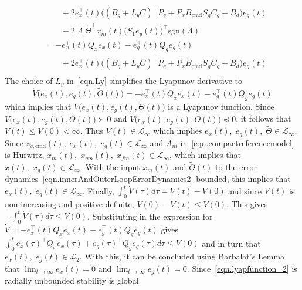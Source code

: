 \begin{proof-dan}
\begin{equation*}
\begin{split}
      & \qquad
      + 2e_{x}^{\top}(t)\bigr((B_{g}+L_{y}C)^{\top}P_{g} + P_{x}B_{\text{cmd}}S_{g}C_{g} + B_{d} \bigr)e_{g}(t) \\
      & \qquad
      - 2|\Lambda|\widetilde{\Theta}^{\top}x_{m}(t)\bigr(S_{1}e_{y}(t)\bigr)^{\top}\text{sgn}(\Lambda) \\
      &=
      - e_{x}^{\top}(t)Q_{x}e_{x}(t)
      - e_{g}^{\top}(t)Q_{g}e_{g}(t) \\
      & \qquad
      + 2e_{x}^{\top}(t)\bigr((B_{g}+L_{y}C)^{\top}P_{g} + P_{x}B_{\text{cmd}}S_{g}C_{g} + B_{d} \bigr)e_{g}(t) \\
    \end{split}
  \end{equation*}
  The choice of $L_{y}$ in\ \eqref{eqn.Ly} simplifies the Lyapunov derivative to
  \begin{equation}
    \label{eqn.outerlooplyapderivative}
    \dot{V}\bigr(e_{x}(t), e_{g}(t), \widetilde{\Theta}(t)\bigr)
    =
    - e_{x}^{\top}(t)Q_{x}e_{x}(t)
    - e_{g}^{\top}(t)Q_{g}e_{g}(t)
  \end{equation}
  which implies that $V\bigr(e_{x}(t), e_{g}(t), \widetilde{\Theta}(t)\bigr)$ is a Lyapunov function.
  Since $V\bigr(e_{x}(t), e_{g}(t), \widetilde{\Theta}(t)\bigr)\succ0$ and $\dot{V}\bigr(e_{x}(t), e_{g}(t), \widetilde{\Theta}(t)\bigr)\preceq0$, it follows that $V(t)\leq V(0)<\infty$.
  Thus $V(t)\in\mathcal{L}_{\infty}$ which implies $e_{x}(t), \; e_{g}(t), \; \widetilde{\Theta}\in\mathcal{L}_{\infty}$.
  Since $z_{g,\text{cmd}}(t), \; e_{x}(t), \; e_{g}(t) \in\mathcal{L}_{\infty}$ and $\bar{A}_{m}$ in\ \eqref{eqn.compactreferencemodel} is Hurwitz, $x_{m}(t), \; x_{gm}(t), \; x_{fm}(t) \in\mathcal{L}_{\infty}$, which implies that $x(t), \; x_{g}(t) \in\mathcal{L}_{\infty}$.
  With the input $x_{m}(t)$ and $\widetilde{\Theta}(t)$ to the error dynamics\ \eqref{eqn.innerAndOuterLoopErrorDynamics2} bounded, this implies that $\dot{e}_{x}(t), \; \dot{e}_{g}(t)\in\mathcal{L}_{\infty}$.
  Finally, $\int_{0}^{t}\dot{V}(\tau)d\tau=V(t)-V(0)$ and since $V(t)$ is non increasing and positive definite, $V(0)-V(t)\leq V(0)$.
  This gives $-\int_{0}^{t}\dot{V}(\tau)d\tau\leq V(0)$.
  Substituting in the expression for $\dot{V}= - e_{x}^{\top}(t)Q_{x}e_{x}(t) - e_{g}^{\top}(t)Q_{g}e_{g}(t)$ gives $\int_{0}^{t}e_{x}(\tau)^{\top}Q_{x}e_{x}(\tau) + e_{g}(\tau)^{\top}Q_{g}e_{g}(\tau)d\tau\leq V(0)$ and in turn that $e_{x}(t), \; e_{g}(t) \in\mathcal{L}_{2}$.
  With this, it can be concluded using Barbalat's Lemma\ \cite{narendra.stable.2005} that $\lim_{t\rightarrow\infty}e_{x}(t)=0$ and $\lim_{t\rightarrow\infty}e_{g}(t)=0$.
  Since\ \eqref{eqn.lyapfunction_2} is radially unbounded stability is global.
\end{proof-dan}

